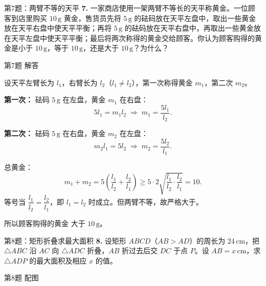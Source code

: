 \documentclass[10pt,aspectratio=169,serif]{beamer}
\begin{document}
\begin{frame}[t]{第7题：两臂不等的天平}
\textbf{7.} 一家商店使用一架两臂不等长的天平称黄金。一位顾客到店里购买 $10\,\mathrm{g}$ 黄金，售货员先将 $5\,\mathrm{g}$ 的砝码放在天平左盘中，取出一些黄金放在天平右盘中使天平平衡；再将 $5\,\mathrm{g}$ 的砝码放在天平右盘中，再取出一些黄金放在天平左盘中使天平平衡；最后将两次称得的黄金交给顾客。你认为顾客购得的黄金是小于 $10\,\mathrm{g}$，等于 $10\,\mathrm{g}$，还是大于 $10\,\mathrm{g}$？为什么？
\end{frame}

\begin{frame}[t]{第7题 解答}
\begin{tcolorbox}[colback=orange!10,colframe=orange,title=\textbf{解}]
设天平左臂长为 $l_1$，右臂长为 $l_2$（$l_1\ne l_2$），第一次称得黄金 $m_1$，第二次 $m_2$。

\textbf{第一次：} 砝码 $5\,\mathrm{g}$ 在左盘，黄金 $m_1$ 在右盘：
\[
5l_1=m_1l_2 \;\Rightarrow\; m_1=\frac{5l_1}{l_2}.
\]

\textbf{第二次：} 砝码 $5\,\mathrm{g}$ 在右盘，黄金 $m_2$ 在左盘：
\[
m_2l_1=5l_2 \;\Rightarrow\; m_2=\frac{5l_2}{l_1}.
\]

总黄金：
\[
m_1+m_2=5\left(\frac{l_1}{l_2}+\frac{l_2}{l_1}\right)\ge 5\cdot 2\sqrt{\frac{l_1}{l_2}\cdot\frac{l_2}{l_1}}=10.
\]
等号当 $\dfrac{l_1}{l_2}=\dfrac{l_2}{l_1}$，即 $l_1=l_2$ 时成立。但两臂不等，故严格大于。

\vspace{0.3em}
所以顾客购得的黄金 \alert{大于 $10\,\mathrm{g}$}。
\end{tcolorbox}
\end{frame}

\begin{frame}[t]{第8题：矩形折叠求最大面积}
\textbf{8.} 设矩形 $ABCD$（$AB>AD$）的周长为 $24\,\mathrm{cm}$，把 $\triangle ABC$ 沿 $AC$ 向 $\triangle ADC$ 折叠，$AB$ 折过去后交 $DC$ 于点 $P$。设 $AB=x\,\mathrm{cm}$，求 $\triangle ADP$ 的最大面积及相应 $x$ 的值。
\end{frame}

\begin{frame}[t]{第8题 配图}
\begin{center}
\end{center}
\end{frame}
\end{document}
